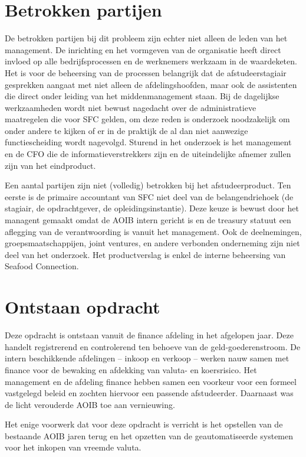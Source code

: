 \documentclass[10pt,a4paper,twoside]{report}
\begin{document}
\section{Betrokken partijen}
De betrokken partijen bij dit probleem zijn echter niet alleen de leden van het management. De inrichting en het vormgeven van de organisatie heeft direct invloed op alle bedrijfsprocessen en de werknemers werkzaam in de waardeketen. Het is voor de beheersing van de processen belangrijk dat de afstudeerstagiair gesprekken aangaat met niet alleen de afdelingshoofden, maar ook de assistenten die direct onder leiding van het middenmanagement staan. Bij de dagelijkse werkzaamheden wordt niet bewust nagedacht over de administratieve maatregelen die voor SFC gelden, om deze reden is onderzoek noodzakelijk om onder andere te kijken of er in de praktijk de al dan niet aanwezige functiescheiding wordt nagevolgd. Sturend in het onderzoek is het management en de CFO die de informatieverstrekkers zijn en de uiteindelijke afnemer zullen zijn van het eindproduct. 

Een aantal partijen zijn niet (volledig) betrokken bij het afstudeerproduct. Ten eerste is de primaire accountant van SFC niet deel van de belangendriehoek (de stagiair, de opdrachtgever, de opleidingsinstantie). Deze keuze is bewust door het managent gemaakt omdat de AOIB intern gericht is en de treasury statuut een aflegging van de verantwoording is vanuit het management. 
Ook de deelnemingen, groepsmaatschappijen, joint ventures, en andere verbonden onderneming zijn niet deel van het onderzoek. Het productverslag is enkel de interne beheersing van Seafood Connection.

\section{Ontstaan opdracht}
Deze opdracht is ontstaan vanuit de finance afdeling in het afgelopen jaar. Deze handelt registrerend en controlerend ten behoeve van de geld-goederenstroom. De intern beschikkende afdelingen – inkoop en verkoop – werken nauw samen met finance voor de bewaking en afdekking van valuta- en koersrisico. Het management en de afdeling finance hebben samen een voorkeur voor een formeel vastgelegd beleid en zochten hiervoor een passende afstudeerder. Daarnaast was de licht verouderde AOIB toe aan vernieuwing.

Het enige voorwerk dat voor deze opdracht is verricht is het opstellen van de bestaande AOIB jaren terug en het opzetten van de geautomatiseerde systemen voor het inkopen van vreemde valuta.
\end{document}
